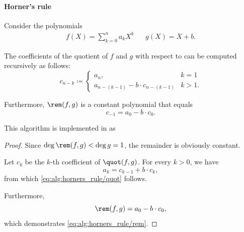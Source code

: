 \paragraph{Horner's rule}

\begin{algorithm}\label{alg:horners_rule}
  Consider the polynomials
  \begin{align*}
    f(X) = \sum_{k=0}^n a_k X^k
    &&
    g(X) = X + b.
  \end{align*}

  The coefficients of the quotient of \( f \) and \( g \) with respect to  can be computed recursively as follows:
  \begin{equation}\label{eq:alg:horners_rule/quot}
    c_{n-k} \coloneqq \begin{cases}
      a_n,                              &k = 1 \\
      a_{n-(k-1)} - b \cdot c_{n-(k-1)} &k > 1.
    \end{cases}
  \end{equation}

  Furthermore, \( \rem(f, g) \) is a constant polynomial that equals
  \begin{equation}\label{eq:alg:horners_rule/rem}
    c_{-1} = a_0 - b \cdot c_0.
  \end{equation}
\end{algorithm}
\begin{comments}
  \item This algorithm is implemented in \cite{notebook:code} as
  \begin{CodeRefDisplay}
  \end{CodeRefDisplay}
\end{comments}
\begin{proof}
  Since \( \deg \rem(f, g) < \deg g = 1 \), the remainder is obviously constant.

  Let \( c_k \) be the \( k \)-th coefficient of \( \quot(f, g) \). For every \( k > 0 \), we have
  \begin{equation*}
    a_k = c_{k-1} + b \cdot c_k,
  \end{equation*}
  from which \eqref{eq:alg:horners_rule/quot} follows.

  Furthermore,
  \begin{equation*}
    \rem(f, g) = a_0 - b \cdot c_0,
  \end{equation*}
  which demonstrates \eqref{eq:alg:horners_rule/rem}.
\end{proof}

